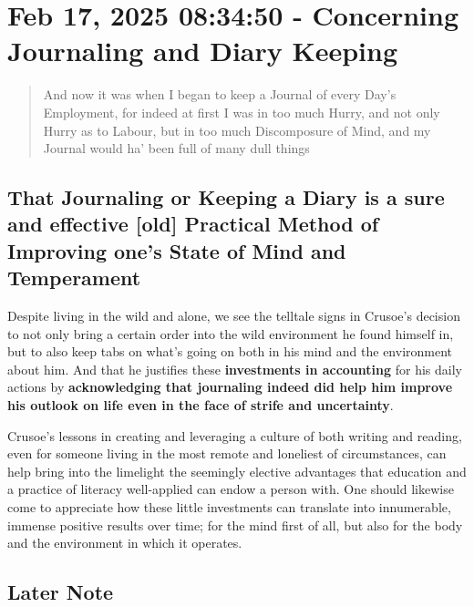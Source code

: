 \documentclass[a4paper]{article}
\begin{document}
\section{Feb 17, 2025 08:34:50 - Concerning Journaling and Diary Keeping}
\label{SEC16}



\noindent
\begin{minipage}{1\textwidth}
\vspace{1em}
\begin{quotation}
{\ttfamily


And now it was when I began to keep a Journal of every Day’s Employment, for indeed at first I was in too much Hurry, and not only Hurry as to Labour, but in too much Discomposure of Mind, and my Journal would ha’ been full of many dull things


}
\end{quotation}
\vspace{1em}
\end{minipage}


\subsection{That Journaling or Keeping a Diary is a sure and effective [old] Practical Method of Improving one's State of Mind and Temperament}


Despite living in the wild and alone, we see the telltale signs in Crusoe's decision to not only bring a certain order into the wild environment he found himself in, but to also keep tabs on what's going on both in his mind and the environment about him. And that he justifies these \textbf{investments in accounting} for his daily actions by \textbf{acknowledging that journaling indeed did help him improve his outlook on life even in the face of strife and uncertainty}. 

Crusoe's lessons in creating and leveraging a culture of both writing and reading, even for someone living in the most remote and loneliest of circumstances, can help bring into the limelight the seemingly elective advantages that education and a practice of literacy well-applied can endow a person with. One should likewise come to appreciate how these little investments can translate into innumerable, immense positive results over time; for the mind first of all, but also for the body and the environment in which it operates.

\subsection{Later Note}
\end{document}

